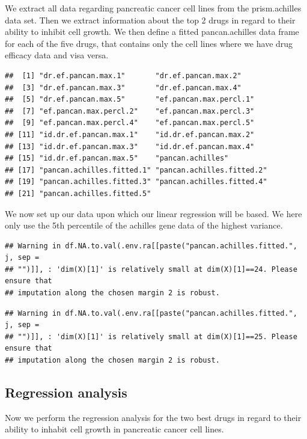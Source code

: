 \documentclass[
]{article}
\begin{document}
We extract all data regarding pancreatic cancer cell lines from the
prism.achilles data set. Then we extract information about the top 2
drugs in regard to their ability to inhibit cell growth. We then define
a fitted pancan.achilles data frame for each of the five drugs, that
contains only the cell lines where we have drug efficacy data and visa
versa.

\begin{verbatim}
##  [1] "dr.ef.pancan.max.1"       "dr.ef.pancan.max.2"      
##  [3] "dr.ef.pancan.max.3"       "dr.ef.pancan.max.4"      
##  [5] "dr.ef.pancan.max.5"       "ef.pancan.max.percl.1"   
##  [7] "ef.pancan.max.percl.2"    "ef.pancan.max.percl.3"   
##  [9] "ef.pancan.max.percl.4"    "ef.pancan.max.percl.5"   
## [11] "id.dr.ef.pancan.max.1"    "id.dr.ef.pancan.max.2"   
## [13] "id.dr.ef.pancan.max.3"    "id.dr.ef.pancan.max.4"   
## [15] "id.dr.ef.pancan.max.5"    "pancan.achilles"         
## [17] "pancan.achilles.fitted.1" "pancan.achilles.fitted.2"
## [19] "pancan.achilles.fitted.3" "pancan.achilles.fitted.4"
## [21] "pancan.achilles.fitted.5"
\end{verbatim}

We now set up our data upon which our linear regression will be based.
We here only use the 5th percentile of the achilles gene data of the
highest variance.

\begin{verbatim}
## Warning in df.NA.to.val(.env.ra[[paste("pancan.achilles.fitted.", j, sep =
## "")]], : 'dim(X)[1]' is relatively small at dim(X)[1]==24. Please ensure that
## imputation along the chosen margin 2 is robust.
\end{verbatim}

\begin{verbatim}
## Warning in df.NA.to.val(.env.ra[[paste("pancan.achilles.fitted.", j, sep =
## "")]], : 'dim(X)[1]' is relatively small at dim(X)[1]==25. Please ensure that
## imputation along the chosen margin 2 is robust.
\end{verbatim}

\hypertarget{regression-analysis-1}{%
\subsection{Regression analysis}\label{regression-analysis-1}}

Now we perform the regression analysis for the two best drugs in regard
to their ability to inhabit cell growth in pancreatic cancer cell lines.
\end{document}
